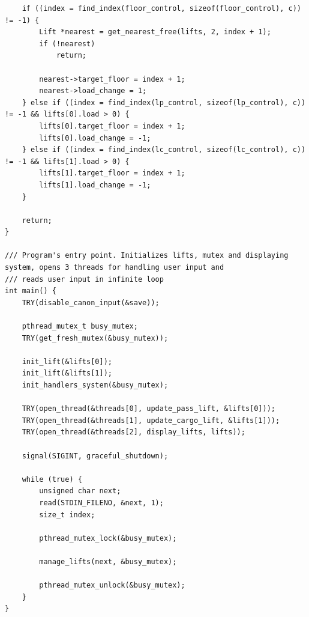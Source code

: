 \begin{verbatim}
    if ((index = find_index(floor_control, sizeof(floor_control), c)) != -1) {
        Lift *nearest = get_nearest_free(lifts, 2, index + 1);
        if (!nearest)
            return;

        nearest->target_floor = index + 1;
        nearest->load_change = 1;
    } else if ((index = find_index(lp_control, sizeof(lp_control), c)) != -1 && lifts[0].load > 0) {
        lifts[0].target_floor = index + 1;
        lifts[0].load_change = -1;
    } else if ((index = find_index(lc_control, sizeof(lc_control), c)) != -1 && lifts[1].load > 0) {
        lifts[1].target_floor = index + 1;
        lifts[1].load_change = -1;
    }

    return;
}

/// Program's entry point. Initializes lifts, mutex and displaying system, opens 3 threads for handling user input and
/// reads user input in infinite loop
int main() {
    TRY(disable_canon_input(&save));

    pthread_mutex_t busy_mutex;
    TRY(get_fresh_mutex(&busy_mutex));

    init_lift(&lifts[0]);
    init_lift(&lifts[1]);
    init_handlers_system(&busy_mutex);

    TRY(open_thread(&threads[0], update_pass_lift, &lifts[0]));
    TRY(open_thread(&threads[1], update_cargo_lift, &lifts[1]));
    TRY(open_thread(&threads[2], display_lifts, lifts));

    signal(SIGINT, graceful_shutdown);

    while (true) {
        unsigned char next;
        read(STDIN_FILENO, &next, 1);
        size_t index;

        pthread_mutex_lock(&busy_mutex);

        manage_lifts(next, &busy_mutex);

        pthread_mutex_unlock(&busy_mutex);
    }
}

\end{verbatim}
